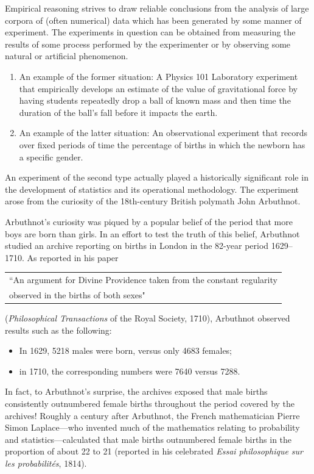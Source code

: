 \bigskip

Empirical reasoning strives to draw reliable conclusions from the analysis of large corpora of (often numerical) data which has been generated by some manner of experiment.  The experiments in question can be obtained from measuring the results of some process performed by the experimenter or by observing some natural or artificial phenomenon.
\begin{enumerate}
\item
An example of the former situation:  A Physics 101 Laboratory experiment that empirically develops an estimate of the value of gravitational force by having students repeatedly drop a ball of known mass and then time the duration of the ball's fall before it impacts the earth.

\item
An example of the latter situation:  An observational experiment that records over fixed periods of time the percentage of births in which the newborn has a specific gender.
\end{enumerate}

An experiment of the second type actually played a historically significant role in the development of statistics and its operational methodology.  The experiment arose from the curiosity of the 18th-century British polymath John Arbuthnot.

\smallskip

Arbuthnot's curiosity was piqued by a popular belief of the period that more boys are born than girls.  In an effort to test the truth of this belief, Arbuthnot studied an archive reporting on births in London in the 82-year period 1629--1710.  As reported in his paper

\begin{tabular}{l}
``An argument for Divine Providence taken from the constant regularity \\
\hspace*{.05in}observed in the births of both sexes"
\end{tabular}

\noindent
({\it Philosophical Transactions} of the Royal Society, 1710), Arbuthnot observed results such as the following:
\begin{itemize}
\item
In 1629, 5218 males were born, versus only 4683 females;
\item
in 1710, the corresponding numbers were 7640 versus 7288.
\end{itemize}
In fact, to Arbuthnot's surprise, the archives exposed that male births consistently outnumbered female births throughout the period covered by the archives!  Roughly a century after Arbuthnot, the French mathematician Pierre Simon Laplace---who invented much of the mathematics relating to probability and statistics---calculated that male births outnumbered female births in the proportion of about 22 to 21 (reported in his celebrated {\it Essai philosophique sur les probabilit\'{e}s}, 1814).

